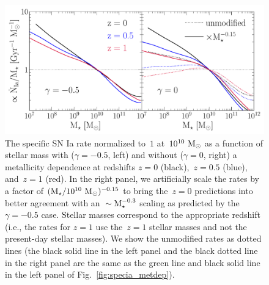 \documentclass[ms.tex]{subfiles}
\begin{document}

\begin{figure}
\centering
\includegraphics[scale = 0.65]{umachine_iarate_redshiftevol.pdf}
\caption{
The specific SN Ia rate normalized to~$1$ at~$10^{10}~\text{M}_\odot$ as a function of
stellar mass with ($\gamma = -0.5$, left) and without ($\gamma = 0$, right) a
metallicity dependence at redshifts $z = 0$ (black),~$z = 0.5$ (blue),
and~$z = 1$ (red).
In the right panel, we artificially scale the rates by a factor of
$(\text{M}_\star / 10^{10}~\text{M}_\odot)^{-0.15}$ to bring the~$z = 0$ predictions into
better agreement with an~$\sim \text{M}_\star^{-0.3}$ scaling as predicted by the
$\gamma = -0.5$ case.
Stellar masses correspond to the appropriate redshift (i.e., the rates for
$z = 1$ use the~$z = 1$ stellar masses and not the present-day stellar
masses).
We show the unmodified rates as dotted lines (the black solid line in the left
panel and the black dotted line in the right panel are the same as the green
line and black solid line in the left panel of Fig.~\ref{fig:specia_metdep}).
}
\label{fig:specia_zdep}
\end{figure}
\end{document}
